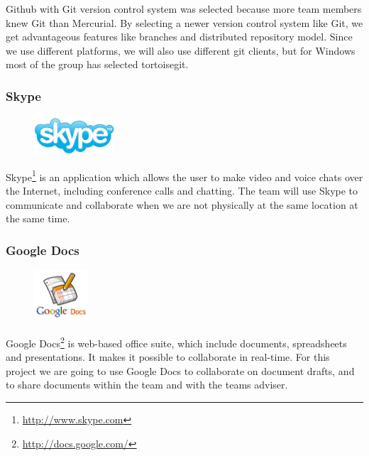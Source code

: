 Github with Git version control system was selected because more team members
knew Git than Mercurial. By selecting a newer version control system like Git,
we get advantageous features like branches and distributed repository model.
Since we use different platforms, we will also use different git clients, but
for Windows most of the group has selected tortoisegit.

\subsubsection{Skype}
\begin{figure}
	\vspace{-20pt}
	\includegraphics[width=3cm]{./planning/img/skype_logo}
	\vspace{-20pt}
\end{figure}
Skype\footnote{\url{http://www.skype.com}} is an application which allows the
user to make video and voice chats over the Internet, including conference
calls and chatting. The team will use Skype to communicate and collaborate when
we are not physically at the same location at the same time.

\subsubsection{Google Docs}
\begin{figure}
	\vspace{-20pt}
	\includegraphics[width=2cm]{./planning/img/google_docs_logo}
	\vspace{-20pt}
\end{figure}
Google Docs\footnote{\url{http://docs.google.com/}} is web-based office suite,
which include documents, spreadsheets and presentations. It makes it possible
to collaborate in real-time. For this project we are going to use Google Docs
to collaborate on document drafts, and to share documents within the team and
with the teams adviser.

